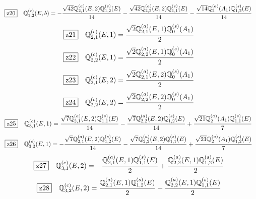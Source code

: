 \documentclass[fleqn,10pt,landscape]{jsarticle}
\begin{document}
\begin{dmath*}
\hspace*{3mm}\fbox{z20}\quad \mathbb{Q}_{1,2}^{(c)}(E,b)=- \frac{\sqrt{42} \mathbb{Q}_{2,1}^{(a)}(E,2) \mathbb{Q}_{1,2}^{(s)}(E)}{14} - \frac{\sqrt{42} \mathbb{Q}_{2,2}^{(a)}(E,2) \mathbb{Q}_{1,1}^{(s)}(E)}{14} - \frac{\sqrt{14} \mathbb{Q}_{2}^{(a)}(A_{1}) \mathbb{Q}_{1,2}^{(s)}(E)}{14}
\end{dmath*}
\begin{dmath*}
\hspace*{3mm}\fbox{z21}\quad \mathbb{Q}_{2,1}^{(c)}(E,1)=\frac{\sqrt{2} \mathbb{Q}_{2,1}^{(a)}(E,1) \mathbb{Q}_{0}^{(s)}(A_{1})}{2}
\end{dmath*}
\begin{dmath*}
\hspace*{3mm}\fbox{z22}\quad \mathbb{Q}_{2,2}^{(c)}(E,1)=\frac{\sqrt{2} \mathbb{Q}_{2,2}^{(a)}(E,1) \mathbb{Q}_{0}^{(s)}(A_{1})}{2}
\end{dmath*}
\begin{dmath*}
\hspace*{3mm}\fbox{z23}\quad \mathbb{Q}_{2,1}^{(c)}(E,2)=\frac{\sqrt{2} \mathbb{Q}_{2,1}^{(a)}(E,2) \mathbb{Q}_{0}^{(s)}(A_{1})}{2}
\end{dmath*}
\begin{dmath*}
\hspace*{3mm}\fbox{z24}\quad \mathbb{Q}_{2,2}^{(c)}(E,2)=\frac{\sqrt{2} \mathbb{Q}_{2,2}^{(a)}(E,2) \mathbb{Q}_{0}^{(s)}(A_{1})}{2}
\end{dmath*}
\begin{dmath*}
\hspace*{3mm}\fbox{z25}\quad \mathbb{Q}_{3,1}^{(c)}(E,1)=\frac{\sqrt{7} \mathbb{Q}_{2,1}^{(a)}(E,2) \mathbb{Q}_{1,1}^{(s)}(E)}{14} - \frac{\sqrt{7} \mathbb{Q}_{2,2}^{(a)}(E,2) \mathbb{Q}_{1,2}^{(s)}(E)}{14} + \frac{\sqrt{21} \mathbb{Q}_{2}^{(a)}(A_{1}) \mathbb{Q}_{1,1}^{(s)}(E)}{7}
\end{dmath*}
\begin{dmath*}
\hspace*{3mm}\fbox{z26}\quad \mathbb{Q}_{3,2}^{(c)}(E,1)=- \frac{\sqrt{7} \mathbb{Q}_{2,1}^{(a)}(E,2) \mathbb{Q}_{1,2}^{(s)}(E)}{14} - \frac{\sqrt{7} \mathbb{Q}_{2,2}^{(a)}(E,2) \mathbb{Q}_{1,1}^{(s)}(E)}{14} + \frac{\sqrt{21} \mathbb{Q}_{2}^{(a)}(A_{1}) \mathbb{Q}_{1,2}^{(s)}(E)}{7}
\end{dmath*}
\begin{dmath*}
\hspace*{3mm}\fbox{z27}\quad \mathbb{Q}_{3,1}^{(c)}(E,2)=- \frac{\mathbb{Q}_{2,1}^{(a)}(E,1) \mathbb{Q}_{1,1}^{(s)}(E)}{2} + \frac{\mathbb{Q}_{2,2}^{(a)}(E,1) \mathbb{Q}_{1,2}^{(s)}(E)}{2}
\end{dmath*}
\begin{dmath*}
\hspace*{3mm}\fbox{z28}\quad \mathbb{Q}_{3,2}^{(c)}(E,2)=\frac{\mathbb{Q}_{2,1}^{(a)}(E,1) \mathbb{Q}_{1,2}^{(s)}(E)}{2} + \frac{\mathbb{Q}_{2,2}^{(a)}(E,1) \mathbb{Q}_{1,1}^{(s)}(E)}{2}
\end{dmath*}
\vspace{5mm}
\end{document}
